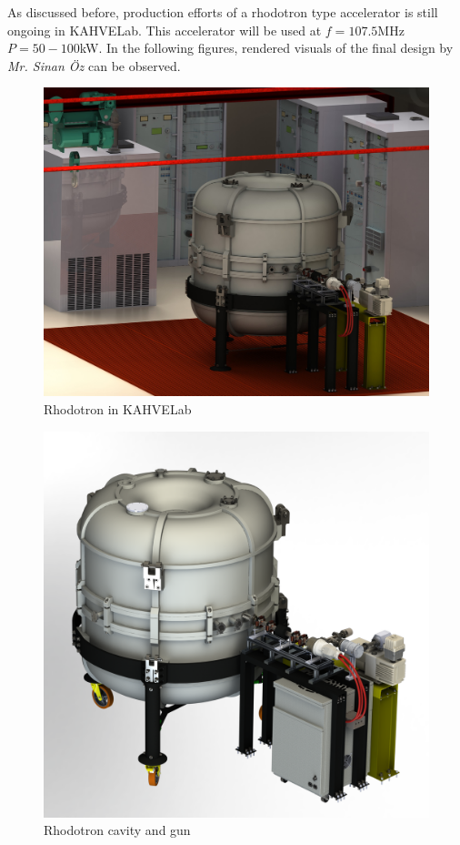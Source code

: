 \documentclass[a4paper,oneside,12pt]{report}
\numberwithin{equation}{chapter}
\begin{document}
As discussed before, production efforts of a rhodotron type accelerator is still ongoing in KAHVELab.
This accelerator will be used at $f=107.5$MHz $P=50-100$kW. 
In the following figures, rendered visuals of the final design by \textit{Mr. Sinan Öz} can be observed.
\begin{figure}[H]
    \centering
    \includegraphics[width=\linewidth]{./figures/design/final_design_in_lab.JPG}
    \caption{Rhodotron in KAHVELab}
\end{figure}

\begin{figure}
    \centering
    \includegraphics[width=\linewidth]{./figures/design/final_design_1.png}
    \caption{Rhodotron cavity and \e gun}
\end{figure}
\end{document}
